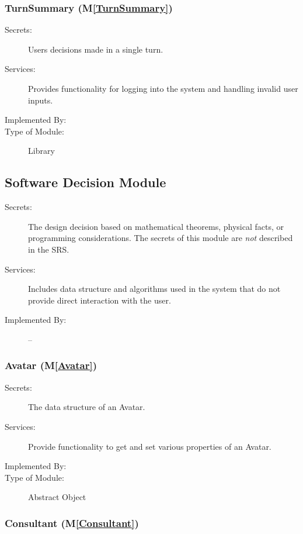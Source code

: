 \documentclass[12pt, titlepage]{article}
\newcommand{\mref}[1]{M\ref{#1}}
\begin{document}
\subsubsection{TurnSummary (\mref{TurnSummary})}

\begin{description}
\item[Secrets:] Users decisions made in a single turn.
\item[Services:] Provides functionality for logging into the system and handling invalid user inputs.
\item[Implemented By:]  \progname
\item[Type of Module:] Library
\end{description}

\subsection{Software Decision Module}

\begin{description}
\item[Secrets:] The design decision based on mathematical theorems, physical
  facts, or programming considerations. The secrets of this module are
  \emph{not} described in the SRS.
\item[Services:] Includes data structure and algorithms used in the system that
  do not provide direct interaction with the user. 
\item[Implemented By:] --
\end{description}


\subsubsection{Avatar (\mref{Avatar})}

\begin{description}
\item[Secrets:] The data structure of an Avatar.
\item[Services:] Provide functionality to get and set various properties of an Avatar.
\item[Implemented By:]  \progname
\item[Type of Module:] Abstract Object
\end{description}

\subsubsection{Consultant (\mref{Consultant})}
\end{document}
